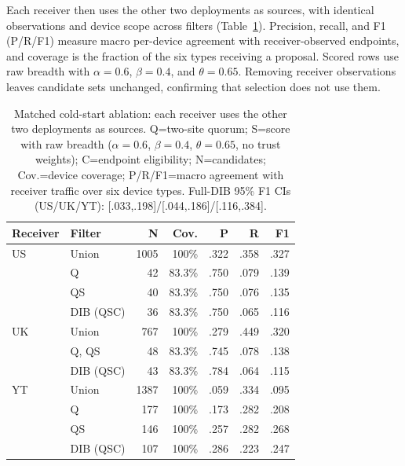 \documentclass[journal]{IEEEtran}
\theoremstyle{definition}
\begin{document}
Each receiver then uses the other two deployments as sources, with identical observations and device scope across filters (Table~\ref{tab:threelab}). Precision, recall, and F1 (P/R/F1) measure macro per-device agreement with receiver-observed endpoints, and coverage is the fraction of the six types receiving a proposal. Scored rows use raw breadth with $\alpha=0.6$, $\beta=0.4$, and $\theta=0.65$. Removing receiver observations leaves candidate sets unchanged, confirming that selection does not use them.

\begin{table}[t]
\centering
\caption{Matched cold-start ablation: each receiver uses the other two deployments as sources. Q=two-site quorum; S=score with raw breadth ($\alpha=0.6$, $\beta=0.4$, $\theta=0.65$, no trust weights); C=endpoint eligibility; N=candidates; Cov.=device coverage; P/R/F1=macro agreement with receiver traffic over six device types. Full-DIB 95\% F1 CIs (US/UK/YT): [.033,.198]/[.044,.186]/[.116,.384].}
\label{tab:threelab}
\scriptsize
\begin{tabular}{@{}llrrrrr@{}}
\toprule
Receiver & Filter & N & Cov. & P & R & F1 \\
\midrule
US & Union & 1005 & 100\% & .322 & .358 & .327 \\
 & Q & 42 & 83.3\% & .750 & .079 & .139 \\
 & QS & 40 & 83.3\% & .750 & .076 & .135 \\
 & DIB (QSC) & 36 & 83.3\% & .750 & .065 & .116 \\
\midrule
UK & Union & 767 & 100\% & .279 & .449 & .320 \\
 & Q, QS & 48 & 83.3\% & .745 & .078 & .138 \\
 & DIB (QSC) & 43 & 83.3\% & .784 & .064 & .115 \\
\midrule
YT & Union & 1387 & 100\% & .059 & .334 & .095 \\
 & Q & 177 & 100\% & .173 & .282 & .208 \\
 & QS & 146 & 100\% & .257 & .282 & .268 \\
 & DIB (QSC) & 107 & 100\% & .286 & .223 & .247 \\
\bottomrule
\end{tabular}
\end{table}
\end{document}
